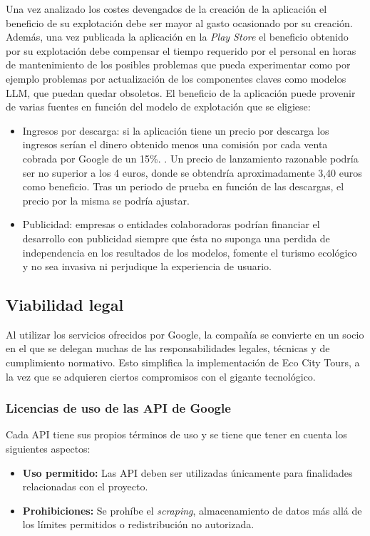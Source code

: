 Una vez analizado los costes devengados de la creación de la aplicación el beneficio de su explotación debe ser mayor al gasto ocasionado por su creación. Además, una vez publicada la aplicación en la \textit{Play Store} el beneficio obtenido por su explotación debe compensar el tiempo requerido por el personal en horas de mantenimiento de los posibles problemas que pueda experimentar como por ejemplo problemas por actualización de los componentes claves como modelos LLM, que puedan quedar obsoletos. El beneficio de la aplicación puede provenir de varias fuentes en función del modelo de explotación que se eligiese:
\begin{itemize}
	\item{Ingresos por descarga:} si la aplicación tiene un precio por descarga los ingresos serían el dinero obtenido menos una comisión por cada venta cobrada por Google de un 15\%. \cite{googleplay_commission}.
	Un precio de lanzamiento razonable podría ser no superior a los 4 euros, donde se obtendría aproximadamente 3,40 euros como beneficio. Tras un periodo de prueba en función de las descargas, el precio por la misma se podría ajustar.
	\item{Publicidad:} empresas o entidades colaboradoras podrían financiar el desarrollo con publicidad siempre que ésta no suponga una perdida de independencia en los resultados de los modelos, fomente el turismo ecológico y no sea invasiva ni perjudique la experiencia de usuario.
	
\end{itemize}

\subsection{Viabilidad legal}
Al utilizar los servicios ofrecidos por Google, la compañía se convierte en un socio en el que se delegan muchas de las responsabilidades legales, técnicas y de cumplimiento normativo. Esto simplifica la implementación de Eco City Tours, a la vez que se adquieren ciertos compromisos con el gigante tecnológico. 

\subsubsection{Licencias de uso de las API de Google}
Cada API tiene sus propios términos de uso \cite{google_cloud_terms} y se tiene que tener en cuenta los siguientes aspectos:
\begin{itemize}
	\item \textbf{Uso permitido:} Las API deben ser utilizadas únicamente para finalidades relacionadas con el proyecto.
	\item \textbf{Prohibiciones:} Se prohíbe el \textit{scraping}, almacenamiento de datos más allá de los límites permitidos o redistribución no autorizada.
\end{itemize}

